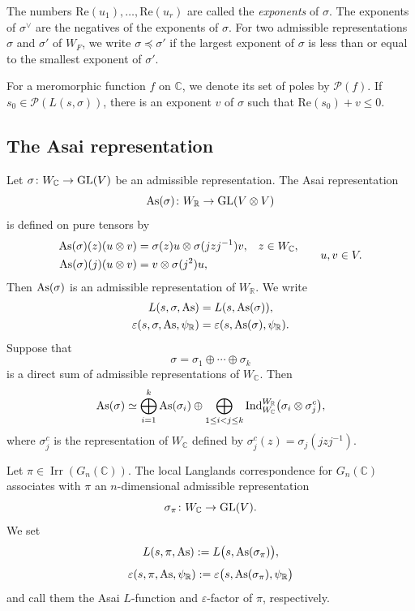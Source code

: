 \documentclass[12pt,reqno]{amsart}
\numberwithin{equation}{section}%
\numberwithin{equation}{subsection}
\theoremstyle{definition}
\theoremstyle{remark}
\begin{document}
The numbers $\mathrm{Re}(u_1),\ldots,\mathrm{Re}(u_r)$ are called the \emph{exponents} of $\sigma$. The exponents of
$\sigma^{\vee}$ are the negatives of the exponents of $\sigma$.
For two admissible representations $\sigma$ and $\sigma'$ of $W_F$,
we write $\sigma\preceq\sigma'$ if the largest exponent of $\sigma$
is less than or equal to the smallest exponent of $\sigma'$.

For a meromorphic function \(f\) on \(\mathbb{C}\), we denote its set
of poles by \(\mathcal{P}(f)\). If $s_0\in\mathcal{P}(L(s,\sigma))$, there is an exponent $v$ of
$\sigma$ such that
$\mathrm{Re}(s_0)+v\leq 0.$

\subsection{The Asai representation}

Let \(\sigma\colon W_{\mathbb{C}}\to{\rm GL}(V)\) be an admissible
representation. The Asai representation
\[
{\rm As}(\sigma)\colon W_{\mathbb{R}}\to{\rm GL}(V\otimes V)
\]
is defined on pure tensors by
\[
\begin{aligned}
{\rm As}(\sigma)(z)(u\otimes v)
&=\sigma(z)u\otimes\sigma(jzj^{-1})v,
&& z\in W_{\mathbb{C}},\\
{\rm As}(\sigma)(j)(u\otimes v)
&=v\otimes\sigma(j^2)u,
\end{aligned}
\qquad u,v\in V.
\] Then \({\rm As}(\sigma)\) is an admissible
representation of \(W_{\mathbb{R}}\). We write
\[
\begin{aligned}
L(s,\sigma,{\rm As})
&=L(s,{\rm As}(\sigma)),\\
\varepsilon(s,\sigma,{\rm As},\psi_{\mathbb{R}})
&=\varepsilon(s,{\rm As}(\sigma),\psi_{\mathbb{R}}).
\end{aligned}
\]
Suppose that
\[
\sigma=\sigma_1\oplus\cdots\oplus\sigma_k
\]
is a direct sum of admissible representations of
$W_{\mathbb{C}}$. Then
\[
{\rm As}(\sigma)
\simeq
\bigoplus_{i=1}^k{\rm As}(\sigma_i)
\oplus
\bigoplus_{1\leq i<j\leq k}
\operatorname{Ind}_{W_{\mathbb{C}}}^{W_{\mathbb{R}}}
\bigl(\sigma_i\otimes\sigma_j^c\bigr),
\]
where $\sigma_j^c$ is the representation of $W_{\mathbb{C}}$ defined by
$
\sigma_j^c(z)
=
\sigma_j(jzj^{-1}).
$

Let $\pi\in\operatorname{Irr}(G_n(\mathbb C))$. The local Langlands
correspondence for $G_n(\mathbb C)$ \cite[Theorem~5]{Kna1994} associates with $\pi$ an
$n$-dimensional admissible representation
\[
\sigma_\pi\colon W_{\mathbb C}\to{\rm GL}(V).
\]
We set
\[
L(s,\pi,{\rm As})
:=
L\bigl(s,{\rm As}(\sigma_\pi)\bigr),
\]
\[
\varepsilon(s,\pi,{\rm As},\psi_{\mathbb R})
:=
\varepsilon\bigl(s,{\rm As}(\sigma_\pi),\psi_{\mathbb R}\bigr)
\]
and call them the Asai $L$-function and $\varepsilon$-factor
of $\pi$, respectively.
\end{document}

